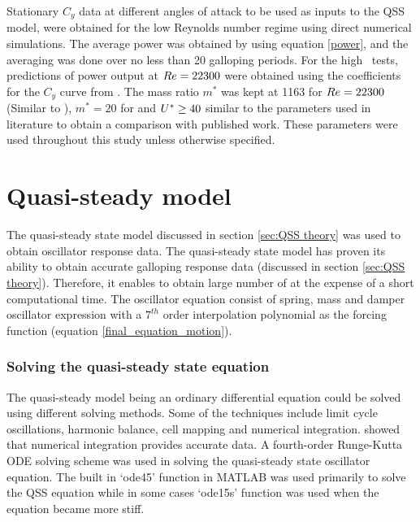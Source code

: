 Stationary $C_y$ data at different angles of attack to be used as inputs to the QSS model, were obtained  for the low Reynolds number regime using direct numerical simulations. The average power was obtained by using equation \ref{power}, and the averaging was done over no less than 20 galloping periods. For the high \reynoldsnumber\ tests, predictions of power output at $Re=22300$ were obtained using the coefficients for the $C_y$  curve from \citet{Parkinson1964}. The mass ratio $m^*$ was kept at 1163 for $Re=22300$ (Similar to \citet{Parkinson1964}), $m^*=20$ for  and $U^{*}\geq 40$ similar to the parameters used in literature \citep{Robertson2003,Joly2012} to obtain a comparison with published work. These parameters were used throughout this study unless otherwise specified.

\section{Quasi-steady model}
\label{sec:QSS_model_methodology}

The quasi-steady state model discussed in section \ref{sec:QSS theory} was used to obtain oscillator response data. The quasi-steady state model has proven its ability to obtain accurate galloping response data (discussed in section \ref{sec:QSS theory}). Therefore, it enables to obtain large number of at the expense of a short computational time. The oscillator equation consist of spring, mass and damper oscillator expression with a $7^{th}$ order interpolation polynomial as the forcing function (equation \ref{final_equation_motion}).

\subsubsection{Solving the quasi-steady state equation}

The quasi-steady model being an ordinary differential equation could be solved using different solving methods. Some of the techniques include limit cycle oscillations, harmonic balance, cell mapping and numerical integration. \citet{Vio2007} showed that numerical integration provides accurate data. A fourth-order Runge-Kutta ODE solving scheme was used in solving the quasi-steady state oscillator equation. The built in `ode45' function in MATLAB was used primarily to solve the QSS equation while in some cases `ode15s' function was used when the equation became more stiff.


